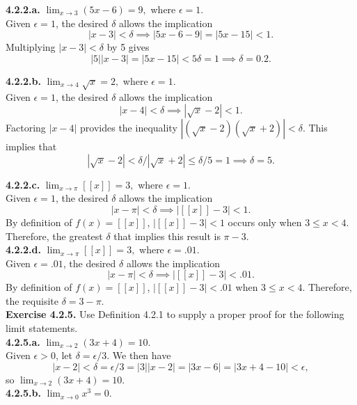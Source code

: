 \documentclass[12pt,letterpaper]{article}
\begin{document}
\textbf{4.2.2.a.} \(\lim_{x \to 3} (5x - 6) = 9,\) where \(\epsilon = 1\). \\

Given \(\epsilon = 1\), the desired \(\delta\) allows the implication \[|x-3| < \delta \implies |5x-6-9| = |5x-15| < 1.\] Multiplying \(|x-3| < \delta\) by 5 gives \[|5||x-3| = |5x-15| < 5\delta = 1 \implies \delta = 0.2.\]

\textbf{4.2.2.b.} \(\lim_{x \to 4} \sqrt{x} = 2,\) where \(\epsilon = 1\). \\

Given \(\epsilon = 1\), the desired \(\delta\) allows the implication \[|x-4| < \delta \implies |\sqrt{x} - 2| < 1.\] Factoring \(|x-4|\) provides the inequality \(|(\sqrt{x}-2)(\sqrt{x}+2)| < \delta\). This implies that \[|\sqrt{x} - 2| < \delta/|\sqrt{x}+2|  \leq \delta/5 = 1 \implies \delta = 5.\]

\textbf{4.2.2.c.} \(\lim_{x \to \pi} [[x]] = 3,\) where \(\epsilon = 1\). \\

Given \(\epsilon = 1\), the desired \(\delta\) allows the implication \[|x-\pi| < \delta \implies |[[x]] - 3| < 1.\] By definition of \(f(x) = [[x]]\), \(|[[x]] - 3| < 1\) occurs only when \(3 \leq x < 4\). Therefore, the greatest \(\delta\) that implies this result is \(\pi - 3\). \\ 

\textbf{4.2.2.d.} \(\lim_{x \to \pi} [[x]] = 3,\) where \(\epsilon = .01\). \\

Given \(\epsilon = .01\), the desired \(\delta\) allows the implication \[|x-\pi| < \delta \implies |[[x]] - 3| < .01.\] By definition of \(f(x) = [[x]]\), \(|[[x]] - 3| < .01\) when \(3 \leq x < 4\). Therefore, the requisite \(\delta = 3-\pi\). \\

\textbf{Exercise 4.2.5.} Use Definition 4.2.1 to supply a proper proof for the following limit statements. \\

\textbf{4.2.5.a.} \(\lim_{x \to 2} (3x + 4) = 10\). \\

Given \(\epsilon > 0\), let \(\delta = \epsilon/3\). We then have \[|x - 2| < \delta = \epsilon/3 = |3||x-2| = |3x-6| = |3x+4-10| < \epsilon,\] so \(\lim_{x \to 2}(3x+4) = 10.\) \\ 

\textbf{4.2.5.b.} \(\lim_{x \to 0} x^{3} = 0\). \\
\end{document}
